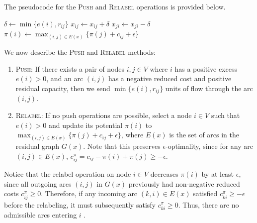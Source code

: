 The pseudocode for the \textsc{Push} and \textsc{Relabel} operations is provided below.

\begin{algorithm}[H]
\caption{\textsc{Push} and \textsc{Relabel} procedures}
\label{alg:push_and_relabel_procs}
    \begin{algorithmic}[1]
            \State $\delta \gets \min\{e(i), r_{ij}\}$
            \State $x_{ij} \gets x_{ij} + \delta$
            \State $x_{ji} \gets x_{ji} - \delta$
        \EndProcedure
\\
            \State $\pi(i) \gets \max_{(i,j)\in E(x)} \{\pi(j)+c_{ij}+\epsilon\}$
        \EndProcedure
    \end{algorithmic}
\end{algorithm}

We now describe the \textsc{Push} and \textsc{Relabel} methods:
\begin{enumerate}
    \item \textsc{Push}: If there exists a pair of nodes $i, j \in V$ where $i$ has a positive excess $e(i) > 0$, and an arc $(i,j)$ has a negative reduced cost and positive residual capacity, then we send $\min\{e(i), r_{ij}\}$ units of flow through the arc $(i,j)$.
    \item \textsc{Relabel}: If no push operations are possible, select a node $i \in V$ such that $e(i) > 0$ and update its potential $\pi(i)$ to $\max_{(i,j) \in E(x)} \{\pi(j) + c_{ij} + \epsilon\}$, where $E(x)$ is the set of arcs in the residual graph $G(x)$. Note that this preserves $\epsilon$-optimality, since for any arc $(i,j) \in E(x)$, $c_{ij}^\pi = c_{ij} - \pi(i) + \pi(j) \geq -\epsilon$.
\end{enumerate}

Notice that the relabel operation on node $i \in V$ decreases $\pi(i)$ by at least $\epsilon$, since all outgoing arcs $(i,j)$ in $G(x)$ previously had non-negative reduced costs $c_{ij}^\pi \geq 0$. 
Therefore, if any incoming arc $(k,i) \in E(x)$ satisfied $c_{ki}^\pi \geq -\epsilon$ before the relabeling, it must subsequently satisfy $c_{ki}^\pi \geq 0$. Thus, there are no admissible arcs entering $i$ \cite{williamson2019}.
